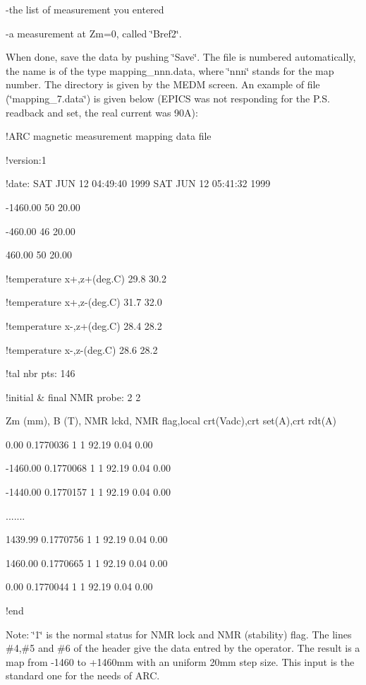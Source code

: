 -the list of measurement you entered 

-a measurement at Zm=0, called \char`\"{}Bref2\char`\"{}. 

When done, save the data by pushing \char`\"{}Save\char`\"{}. The file is numbered
automatically, the name is of the type mapping\_nnn.data, where \char`\"{}nnn\char`\"{}
stands for the map number. The directory is given by the MEDM screen. An example
of file (\char`\"{}mapping\_7.data\char`\"{}) is given below (EPICS was not
responding for the P.S. readback and set, the real current was 90A):

!ARC magnetic measurement mapping data file 

!version:1 

!date: SAT JUN 12 04:49:40 1999 SAT JUN 12 05:41:32 1999 

-1460.00 50 20.00 

-460.00 46 20.00 

460.00 50 20.00 

!temperature x+,z+(deg.C) 29.8 30.2 

!temperature x+,z-(deg.C) 31.7 32.0 

!temperature x-,z+(deg.C) 28.4 28.2 

!temperature x-,z-(deg.C) 28.6 28.2 

!tal nbr pts: 146 

!initial \& final NMR probe: 2 2 

Zm (mm), B (T), NMR lckd, NMR flag,local crt(Vadc),crt set(A),crt rdt(A) 

0.00 0.1770036 1 1 92.19 0.04 0.00 

-1460.00 0.1770068 1 1 92.19 0.04 0.00 

-1440.00 0.1770157 1 1 92.19 0.04 0.00 

....... 

1439.99 0.1770756 1 1 92.19 0.04 0.00 

1460.00 0.1770665 1 1 92.19 0.04 0.00 

0.00 0.1770044 1 1 92.19 0.04 0.00 

!end

Note: \char`\"{}1\char`\"{} is the normal status for NMR lock and NMR (stability)
flag. The lines \#4,\#5 and \#6 of the header give the data entred by the operator.
The result is a map from -1460 to +1460mm with an uniform 20mm step size. This
input is the standard one for the needs of ARC.

%
%
%
